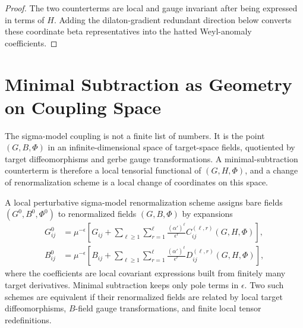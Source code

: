 \begin{proof}
The two counterterms are local and gauge invariant after being expressed in
terms of \(H\).  Adding the dilaton-gradient redundant direction below
converts these coordinate beta representatives into the hatted Weyl-anomaly
coefficients.
\end{proof}

\section{Minimal Subtraction as Geometry on Coupling Space}
\label{sec:nlsm-ms-geometry}

The sigma-model coupling is not a finite list of numbers.  It is the point
\((G,B,\Phi)\) in an infinite-dimensional space of target-space fields,
quotiented by target diffeomorphisms and gerbe gauge transformations.  A
minimal-subtraction counterterm is therefore a local tensorial functional of
\((G,H,\Phi)\), and a change of renormalization scheme is a local change of
coordinates on this space.

\begin{definition}
\label{def:local-sigma-model-scheme}
A local perturbative sigma-model renormalization scheme assigns bare fields
\((G^0,B^0,\Phi^0)\) to renormalized fields \((G,B,\Phi)\) by expansions
\begin{align}
  G^0_{ij}
  &=
  \mu^{-\epsilon}
  \left[
    G_{ij}
    +
    \sum_{\ell\ge1}\sum_{r=1}^{\ell}
    \frac{(\alpha')^\ell}{\epsilon^r}
    C^{(\ell,r)}_{ij}(G,H,\Phi)
  \right],
  \\
  B^0_{ij}
  &=
  \mu^{-\epsilon}
  \left[
    B_{ij}
    +
    \sum_{\ell\ge1}\sum_{r=1}^{\ell}
    \frac{(\alpha')^\ell}{\epsilon^r}
    D^{(\ell,r)}_{ij}(G,H,\Phi)
  \right],
\end{align}
where the coefficients are local covariant expressions built from finitely
many target derivatives.  Minimal subtraction keeps only pole terms in
\(\epsilon\).  Two such schemes are equivalent if their renormalized fields
are related by local target diffeomorphisms, \(B\)-field gauge
transformations, and finite local tensor redefinitions.
\end{definition}

